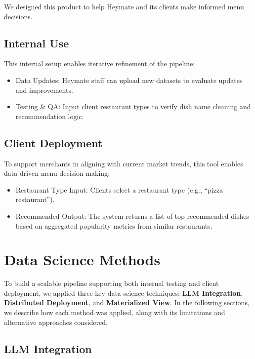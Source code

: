 \documentclass[
  11pt,
  a4paper,
  DIV=11,
  numbers=noendperiod]{scrartcl}
\providecommand{\tightlist}{%
  \setlength{\itemsep}{0pt}\setlength{\parskip}{0pt}}\usepackage{longtable,booktabs,array}
\begin{document}
We designed this product to help Heymate and its clients make informed
menu decisions.

\subsection{Internal Use}\label{internal-use}

This internal setup enables iterative refinement of the pipeline:

\begin{itemize}
\tightlist
\item
  Data Updates: Heymate staff can upload new datasets to evaluate
  updates and improvements.
\item
  Testing \& QA: Input client restaurant types to verify dish name
  cleaning and recommendation logic.
\end{itemize}

\subsection{Client Deployment}\label{client-deployment}

To support merchants in aligning with current market trends, this tool
enables data-driven menu decision-making:

\begin{itemize}
\tightlist
\item
  Restaurant Type Input: Clients select a restaurant type (e.g., ``pizza
  restaurant'').
\item
  Recommended Output: The system returns a list of top recommended
  dishes based on aggregated popularity metrics from similar
  restaurants.
\end{itemize}

\section{Data Science Methods}\label{data-science-methods}

To build a scalable pipeline supporting both internal testing and client
deployment, we applied three key data science techniques: \textbf{LLM
Integration}, \textbf{Distributed Deployment}, and \textbf{Materialized
View}. In the following sections, we describe how each method was
applied, along with its limitations and alternative approaches
considered.

\subsection{LLM Integration}\label{llm-integration}
\end{document}
